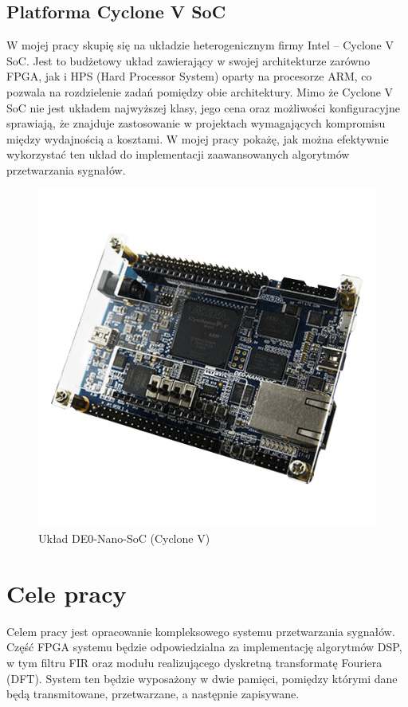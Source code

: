 \subsection{Platforma Cyclone V SoC}
W mojej pracy skupię się na układzie heterogenicznym firmy Intel -- Cyclone V SoC. Jest to budżetowy układ zawierający w swojej architekturze zarówno FPGA, jak i
HPS (Hard Processor System) oparty na procesorze ARM, co pozwala na rozdzielenie zadań pomiędzy obie architektury. Mimo że Cyclone V SoC nie jest układem najwyższej klasy,
jego cena oraz możliwości konfiguracyjne sprawiają, że znajduje zastosowanie w projektach wymagających kompromisu między wydajnością a kosztami. W mojej pracy pokażę, jak można
efektywnie wykorzystać ten układ do implementacji zaawansowanych algorytmów przetwarzania sygnałów.

\begin{figure}[!htb]
    \centerline{\includegraphics[scale=0.2]{de0-nano-soc.png}}
    \caption{Układ DE0-Nano-SoC (Cyclone V)}
    \label{fig:de0-nano-soc}
\end{figure}

\section{Cele pracy}
\label{sec:celePracy}
Celem pracy jest opracowanie kompleksowego systemu przetwarzania sygnałów. Część FPGA systemu będzie odpowiedzialna za implementację algorytmów DSP, w tym filtru FIR oraz modułu
realizującego dyskretną transformatę Fouriera (DFT). System ten będzie wyposażony w dwie pamięci, pomiędzy którymi dane będą transmitowane, przetwarzane, a następnie zapisywane.

